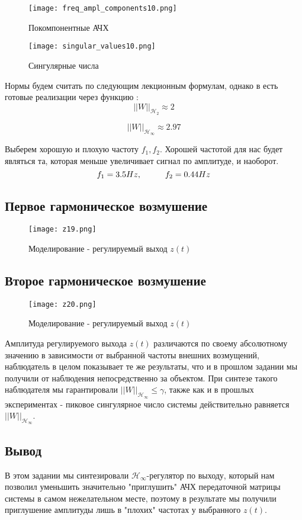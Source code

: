   
  \begin{figure}[ht]
      \centering
      \texttt{[image: freq\_ampl\_components10.png]}
      \caption{Покомпонентные АЧХ}
    \end{figure}
  
  \begin{figure}[ht]
    \centering
    \texttt{[image: singular\_values10.png]}
    \caption{Сингулярные числа}
  \end{figure}
  Нормы будем считать по следующим лекционным формулам, однако в  
  есть готовые реализации через функцию :
  $$
      ||W||_{\mathcal{H}_2}  \approx 2
  $$
  
  $$
      ||W||_{\mathcal{H}_\infty}  \approx 2.97
  $$
  
  Выберем хорошую и плохую частоту $f_1, f_2$. 
  Хорошей частотой для нас будет являться та, которая меньше увеличивает сигнал по амплитуде, и наоборот.
  $$
      f_1 = 3.5 Hz, \hspace*{1cm} f_2 = 0.44 Hz
  $$
  
  \subsection{Первое гармоническое возмушение}
  \begin{figure}[ht]
      \centering
      \texttt{[image: z19.png]}
      \caption{Моделирование -  регулируемый выход $z(t)$}
    \end{figure}
  
  \newpage
  \subsection{Второе гармоническое возмушение}
  \begin{figure}[ht]
      \centering
      \texttt{[image: z20.png]}
      \caption{Моделирование -  регулируемый выход $z(t)$}
    \end{figure}
  

Амплитуда регулируемого выхода $z(t)$ различаются по своему абсолютному значению в зависимости от выбранной частоты
внешних возмущений, наблюдатель в целом показывает те же результаты, что и в прошлом задании мы получили от наблюдения непосредственно за объектом. 
При синтезе такого наблюдателя мы гарантировали $||W||_{\mathcal{H}_\infty} \leq \gamma$,  
также как и в прошлых экспериментах - пиковое сингулярное число системы действительно равняется $||W||_{\mathcal{H}_\infty}$.


\subsection{Вывод}
В этом задании мы синтезировали $\mathcal{H}_\infty$-регулятор по выходу, который нам позволил 
уменьшить значительно "приглушить" АЧХ передаточной матрицы системы в самом нежелательном месте, поэтому в результате мы получили приглушение амплитуды 
лишь в "плохих" частотах у выбранного $z(t)$.
\endinput